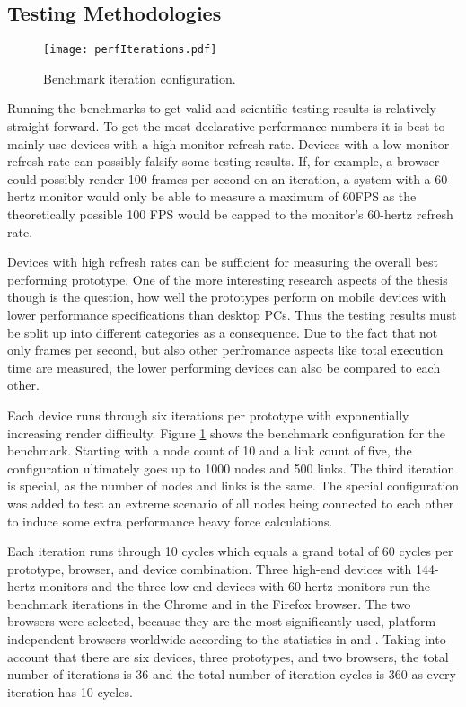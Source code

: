 \subsection{Testing Methodologies}

\begin{figure}
\centering
\texttt{[image: perfIterations.pdf]}
\caption{Benchmark iteration configuration.}
\label{fig:perfIterations}
\end{figure}

Running the benchmarks to get valid and scientific testing results is relatively straight forward. To get the most declarative performance numbers it is best to mainly use devices with a high monitor refresh rate. Devices with a low monitor refresh rate can possibly falsify some testing results. If, for example, a browser could possibly render 100 frames per second on an iteration, a system with a 60-hertz monitor would only be able to measure a maximum of 60FPS as the theoretically possible 100 FPS would be capped to the monitor's 60-hertz refresh rate.

Devices with high refresh rates can be sufficient for measuring the overall best performing prototype. One of the more interesting research aspects of the thesis though is the question, how well the prototypes perform on mobile devices with lower performance specifications than desktop PCs. Thus the testing results must be split up into different categories as a consequence. Due to the fact that not only frames per second, but also other perfromance aspects like total execution time are measured, the lower performing devices can also be compared to each other.

Each device runs through six iterations per prototype with exponentially increasing render difficulty. Figure \ref{fig:perfIterations} shows the benchmark configuration for the benchmark. Starting with a node count of 10 and a link count of five, the configuration ultimately goes up to 1000 nodes and 500 links. The third iteration is special, as the number of nodes and links is the same. The special configuration was added to test an extreme scenario of all nodes being connected to each other to induce some extra performance heavy force calculations.

Each iteration runs through 10 cycles which equals a grand total of 60 cycles per prototype, browser, and device combination. Three high-end devices with 144-hertz monitors and the three low-end devices with 60-hertz monitors run the benchmark iterations in the Chrome and in the Firefox browser. The two browsers were selected, because they are the most significantly used, platform independent browsers worldwide according to the statistics in \cite{StatCounterBrowserMarketShare} and \cite{W3CBrowserMarketShare}. Taking into account that there are six devices, three prototypes, and two browsers, the total number of iterations is 36 and the total number of iteration cycles is 360 as every iteration has 10 cycles.

